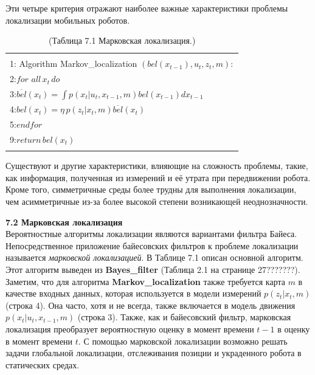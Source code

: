 \documentclass[10pt,a4paper]{article}
\begin{document}
Эти четыре критерия отражают наиболее важные характеристики проблемы локализации мобильных роботов.

\begin{table}[H]
\begin{center}
\begin{tabular}{|l|}
\hline
{}\\
1: \hspace{3mm} Algorithm Markov\_localization $(bel(x_{t-1}),u_t,z_t,m):$ \\
2:\hspace{7mm}$\textit{for all}\, x_t\,\textit{do}$\\
3:\hspace{12mm}$\overline{bel}(x_t)=\int p(x_t|u_t,x_{t-1},m)bel(x_{t-1})dx_{t-1}$\\
4:\hspace{12mm}$bel(x_t)=\eta\,p(z_t|x_t,m)\overline{bel}(x_t)$\\
5:\hspace{7mm}$\textit{endfor}$\\
9:\hspace{7mm}$\textit{return}\,bel(x_t)$\\
{}\\
\hline
\end{tabular}
\caption{(Таблица 7.1 Марковская локализация.)}
	\end{center}
\end{table}

Существуют и другие характеристики, влияющие на сложность проблемы, такие, как информация, полученная из измерений и её утрата при передвижении робота.
Кроме того, симметричные среды более трудны для выполнения локализации, чем асимметричные из-за более высокой степени возникающей неоднозначности. 

\textbf{7.2 Марковская локализация}\\

Вероятностные алгоритмы локализации являются вариантами фильтра Байеса. Непосредственное приложение байесовских фильтров к проблеме локализации называется \textit{марковской локализацией}. В Таблице 7.1 описан основной алгоритм. Этот алгоритм выведен из \textbf{Bayes\_filter} (Таблица 2.1 на странице 27???????). Заметим, что для алгоритма \textbf{Markov\_localization} также требуется карта $m$ в качестве входных данных, которая используется в модели измерений $p(z_t | x_t, m)$ (строка 4). Она часто, хотя и не всегда, также включается в модель движения $p(x_t | u_t, x_{t-1}, m)$ (строка 3). Также, как и байесовский фильтр, марковская локализация преобразует вероятностную оценку в момент времени $t - 1$ в оценку в момент времени $t$. С помощью марковской локализации возможно решать задачи глобальной локализации, отслеживания позиции и украденного робота в статических средах. 
\end{document}
